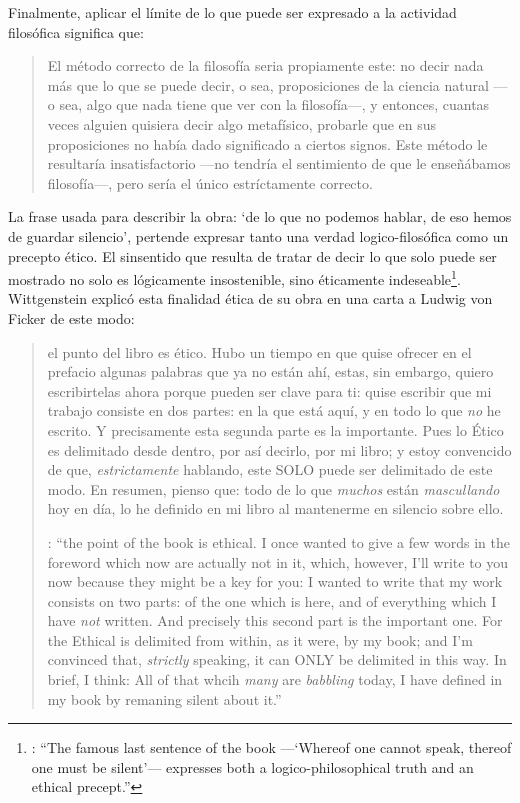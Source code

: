 Finalmente, aplicar el límite de lo que puede ser expresado a la actividad filosófica significa que: \blockquote[{\cite[\S6.53]{wittgenstein1922tractatuses}}]{El método correcto de la filosofía seria propiamente este: no decir nada más que lo que se puede decir, o sea, proposiciones de la ciencia natural ---o sea, algo que nada tiene que ver con la filosofía---, y entonces, cuantas veces alguien quisiera decir algo metafísico, probarle que en sus proposiciones no había dado significado a ciertos signos. Este método le resultaría insatisfactorio ---no tendría el sentimiento de que le enseñábamos filosofía---, pero sería el único estríctamente correcto.} La frase usada para describir la obra: \enquote*{de lo que no podemos hablar, de eso hemos de guardar silencio}, pertende expresar tanto una verdad logico-filosófica como un precepto ético. El sinsentido que resulta de tratar de decir lo que solo puede ser mostrado no solo es lógicamente insostenible, sino éticamente indeseable\footnote{\cite[Cf.~][156]{monk1991duty}: \enquote{The famous last sentence of the book ---`Whereof one cannot speak, thereof one must be silent'--- expresses both a logico-philosophical truth and an ethical precept.}}. Wittgenstein explicó esta finalidad ética de su obra en una carta a Ludwig von Ficker de este modo:
\blockquote[{\cite[22--23]{monk2005howto}}: \enquote{the point of the book is ethical. I once wanted to give a few words in the foreword which now are actually not in it, which, however, I'll write to you now because they might be a key for you: I wanted to write that my work consists on two parts: of the one which is here, and of everything which I have \emph{not} written. And precisely this second part is the important one. For the Ethical is delimited from within, as it were, by my book; and I'm convinced that, \emph{strictly} speaking, it can ONLY be delimited in this way. In brief, I think: All of that whcih \emph{many} are \emph{babbling} today, I have defined in my book by remaning silent about it.}]{el punto del libro es ético. Hubo un tiempo en que quise ofrecer en el prefacio algunas palabras que ya no están ahí, estas, sin embargo, quiero escribirtelas ahora porque pueden ser clave para ti: quise escribir que mi trabajo consiste en dos partes: en la que está aquí, y en todo lo que \emph{no} he escrito. Y precisamente esta segunda parte es la importante. Pues lo Ético es delimitado desde dentro, por así decirlo, por mi libro; y estoy convencido de que, \emph{estrictamente} hablando, este SOLO puede ser delimitado de este modo. En resumen, pienso que: todo de lo que \emph{muchos} están \emph{mascullando} hoy en día, lo he definido en mi libro al mantenerme en silencio sobre ello.}

